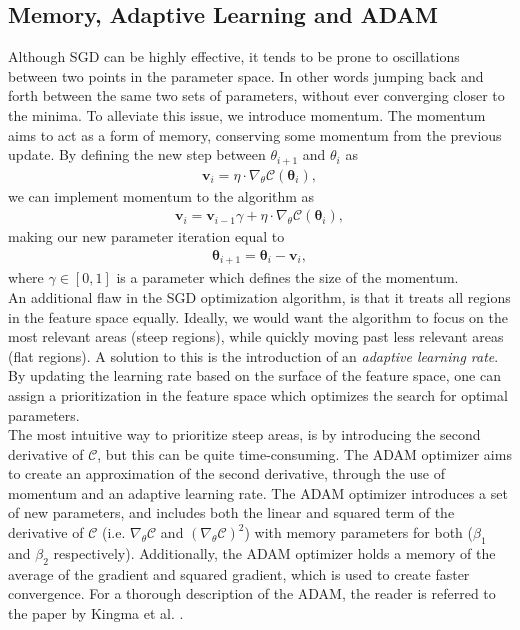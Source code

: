 \subsection{Memory, Adaptive Learning and ADAM}\label{subsec:ADAM}
Although \ac{SGD} can be highly effective, it tends to be prone to oscillations between two points in the parameter space. In other words jumping back and forth between 
the same two sets of parameters, without ever converging closer to the minima. To alleviate this issue, we introduce momentum. The momentum aims to act as a form of 
memory, conserving some momentum from the previous update. By defining the new step between $\theta_{i+1}$ and $\theta_{i}$ as 
\begin{align}
    \textbf{v}_i = \eta \cdot \nabla_\theta \mathcal{C}\left(\boldsymbol{\theta}_i\right),
\end{align}
we can implement momentum to the algorithm as 
\begin{align}
    \textbf{v}_i = \textbf{v}_{i-1} \gamma +\eta \cdot \nabla_\theta \mathcal{C}\left(\boldsymbol{\theta}_i\right),
\end{align}
making our new parameter iteration equal to
\begin{align}
    \boldsymbol{\theta}_{i+1}=\boldsymbol{\theta}_i-\textbf{v}_i,
\end{align}
where $\gamma \in [0,1]$ is a parameter which defines the size of the momentum.
\\
An additional flaw in the \ac{SGD} optimization algorithm, is that it treats all regions in the feature space equally. Ideally, we would want the algorithm to focus 
on the most relevant areas (steep regions), while quickly moving past less relevant areas (flat regions). A solution to this is the introduction of an \emph{adaptive learning rate}.
By updating the learning rate based on the surface of the feature space, one can assign a prioritization in the feature space which optimizes the search for optimal parameters.
\\
The most intuitive way to prioritize steep areas, is by introducing the second derivative of $\mathcal{C}$, but this can be quite time-consuming. The \ac{ADAM} optimizer aims to 
create an approximation of the second derivative, through the use of momentum and an adaptive learning rate. The \ac{ADAM} optimizer introduces a set of new parameters, and includes both the 
linear and squared term of the derivative of $\mathcal{C}$ (i.e. $\nabla_\theta \mathcal{C}$ and $(\nabla_\theta \mathcal{C})^2$) with memory parameters for both ($\beta_1$ and $\beta_2$ respectively). Additionally, the \ac{ADAM} optimizer holds a memory of the average of the 
gradient and squared gradient, which is used to create faster convergence. For a thorough description of the \ac{ADAM}, the reader is referred to the paper by Kingma et al.  \cite{kingma_adam_2017}.
